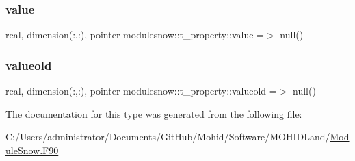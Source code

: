 \subsubsection{\texorpdfstring{value}{value}}
{\footnotesize\ttfamily real, dimension(\+:,\+:), pointer modulesnow\+::t\+\_\+property\+::value =$>$ null()\hspace{0.3cm}{\ttfamily [private]}}

\mbox{\label{structmodulesnow_1_1t__property_a9dca2a599f0f5d2639429950e9d857cc}} 
\subsubsection{\texorpdfstring{valueold}{valueold}}
{\footnotesize\ttfamily real, dimension(\+:,\+:), pointer modulesnow\+::t\+\_\+property\+::valueold =$>$ null()\hspace{0.3cm}{\ttfamily [private]}}



The documentation for this type was generated from the following file\+:\begin{DoxyCompactItemize}
\item 
C\+:/\+Users/administrator/\+Documents/\+Git\+Hub/\+Mohid/\+Software/\+M\+O\+H\+I\+D\+Land/\mbox{\hyperlink{_module_snow_8_f90}{Module\+Snow.\+F90}}\end{DoxyCompactItemize}
